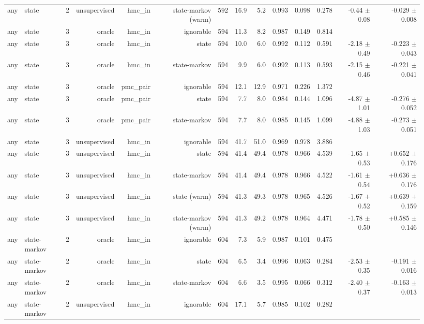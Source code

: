 \begin{table}[ht]
\begin{tabular}{llrrrrrrrrrrrr}
any & state & 2 & unsupervised & hmc\_in & state-markov (warm) & 592 & 16.9 & 5.2 & 0.993 & 0.098 & 0.278 & -0.44 $\pm$ 0.08 & -0.029 $\pm$ 0.008 \\
any & state & 3 & oracle & hmc\_in & ignorable & 594 & 11.3 & 8.2 & 0.987 & 0.149 & 0.814 &  &  \\
any & state & 3 & oracle & hmc\_in & state & 594 & 10.0 & 6.0 & 0.992 & 0.112 & 0.591 & -2.18 $\pm$ 0.49 & -0.223 $\pm$ 0.043 \\
any & state & 3 & oracle & hmc\_in & state-markov & 594 & 9.9 & 6.0 & 0.992 & 0.113 & 0.593 & -2.15 $\pm$ 0.46 & -0.221 $\pm$ 0.041 \\
any & state & 3 & oracle & pmc\_pair & ignorable & 594 & 12.1 & 12.9 & 0.971 & 0.226 & 1.372 &  &  \\
any & state & 3 & oracle & pmc\_pair & state & 594 & 7.7 & 8.0 & 0.984 & 0.144 & 1.096 & -4.87 $\pm$ 1.01 & -0.276 $\pm$ 0.052 \\
any & state & 3 & oracle & pmc\_pair & state-markov & 594 & 7.7 & 8.0 & 0.985 & 0.145 & 1.099 & -4.88 $\pm$ 1.03 & -0.273 $\pm$ 0.051 \\
any & state & 3 & unsupervised & hmc\_in & ignorable & 594 & 41.7 & 51.0 & 0.969 & 0.978 & 3.886 &  &  \\
any & state & 3 & unsupervised & hmc\_in & state & 594 & 41.4 & 49.4 & 0.978 & 0.966 & 4.539 & -1.65 $\pm$ 0.53 & +0.652 $\pm$ 0.176 \\
any & state & 3 & unsupervised & hmc\_in & state-markov & 594 & 41.4 & 49.4 & 0.978 & 0.966 & 4.522 & -1.61 $\pm$ 0.54 & +0.636 $\pm$ 0.176 \\
any & state & 3 & unsupervised & hmc\_in & state (warm) & 594 & 41.3 & 49.3 & 0.978 & 0.965 & 4.526 & -1.67 $\pm$ 0.52 & +0.639 $\pm$ 0.159 \\
any & state & 3 & unsupervised & hmc\_in & state-markov (warm) & 594 & 41.3 & 49.2 & 0.978 & 0.964 & 4.471 & -1.78 $\pm$ 0.50 & +0.585 $\pm$ 0.146 \\
any & state-markov & 2 & oracle & hmc\_in & ignorable & 604 & 7.3 & 5.9 & 0.987 & 0.101 & 0.475 &  &  \\
any & state-markov & 2 & oracle & hmc\_in & state & 604 & 6.5 & 3.4 & 0.996 & 0.063 & 0.284 & -2.53 $\pm$ 0.35 & -0.191 $\pm$ 0.016 \\
any & state-markov & 2 & oracle & hmc\_in & state-markov & 604 & 6.6 & 3.5 & 0.995 & 0.066 & 0.312 & -2.40 $\pm$ 0.37 & -0.163 $\pm$ 0.013 \\
any & state-markov & 2 & unsupervised & hmc\_in & ignorable & 604 & 17.1 & 5.7 & 0.985 & 0.102 & 0.282 &  &  \\

\end{tabular}
\end{table}
